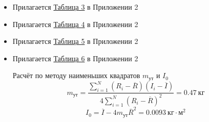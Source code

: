 \begin{itemize}
    \item Прилагается \hyperlink{table3}{Таблица 3} в Приложении 2
    \item Прилагается \hyperlink{table4}{Таблица 4} в Приложении 2
    \item Прилагается \hyperlink{table5}{Таблица 5} в Приложении 2
    \item Прилагается \hyperlink{table6}{Таблица 6} в Приложении 2

    Расчёт по методу наименьших квадратов $m_\text{ут}$ и $I_0$ \\
    \[
        m_\text{ут} = \frac{\sum_{i=1}^{N} \left( R_i - \overline{R} \right) \left( I_i - \overline{I} \right)}{4\sum_{i=1}^{N} \left( R_i - \overline{R} \right)^2} = 0.47 \ \text{кг}
    \]
    \[
        I_0 = \overline{I} - 4m_{\text{ут}}\overline{R}^2 = 0.0093 \ \text{кг} \cdot \text{м}^2
    \]
\end{itemize}